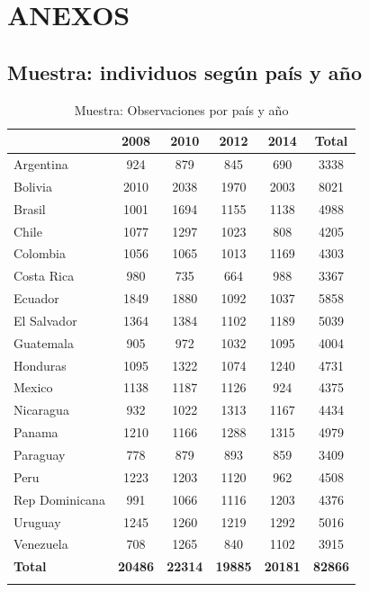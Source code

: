 \documentclass[12pt,letterpaper]{article}
\begin{document}
\newpage

\section{ANEXOS}

\subsection{Muestra: individuos según país y año \label{sec:sec61}}

\begin{table}[H] \centering 
	\caption{Muestra: Observaciones por país y año} 
	\label{tablanpais} 
    \renewcommand{\arraystretch}{0.7}
	\begin{tabular}{@{\extracolsep{5pt}}lccccc} 
		\\[-1.8ex]\hline 
		& \textbf{2008} & \textbf{2010} & \textbf{2012} & \textbf{2014} & \textbf{Total} \\ 
		\hline
		Argentina & 924 & 879 & 845 & 690 & 3338 \\ 
		Bolivia & 2010 & 2038 & 1970 & 2003 & 8021 \\ 
		Brasil & 1001 & 1694 & 1155 & 1138 & 4988 \\ 
		Chile & 1077 & 1297 & 1023 & 808 & 4205 \\ 
		Colombia & 1056 & 1065 & 1013 & 1169 & 4303 \\ 
		Costa Rica & 980 & 735 & 664 & 988 & 3367 \\ 
		Ecuador & 1849 & 1880 & 1092 & 1037 & 5858 \\ 
		El Salvador & 1364 & 1384 & 1102 & 1189 & 5039 \\ 
		Guatemala & 905 & 972 & 1032 & 1095 & 4004 \\ 
		Honduras & 1095 & 1322 & 1074 & 1240 & 4731 \\ 
		Mexico & 1138 & 1187 & 1126 & 924 & 4375 \\ 
		Nicaragua & 932 & 1022 & 1313 & 1167 & 4434 \\ 
		Panama & 1210 & 1166 & 1288 & 1315 & 4979 \\ 
		Paraguay & 778 & 879 & 893 & 859 & 3409 \\ 
		Peru & 1223 & 1203 & 1120 & 962 & 4508 \\ 
		Rep Dominicana & 991 & 1066 & 1116 & 1203 & 4376 \\ 
		Uruguay & 1245 & 1260 & 1219 & 1292 & 5016 \\ 
		Venezuela & 708 & 1265 & 840 & 1102 & 3915 \\ 
		\hline
		\textbf{Total}	&	\textbf{20486}	&	\textbf{22314}	&	\textbf{19885}	&	\textbf{20181}	&	\textbf{82866}	\\
		\hline \\[-1.8ex] 
	\end{tabular} 
\end{table} 
\end{document}
